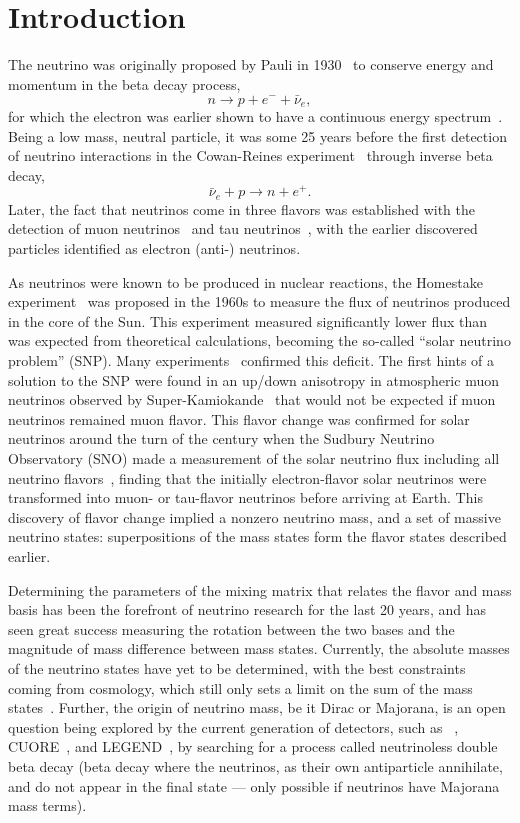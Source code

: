 \chapter{Introduction}
The neutrino was originally proposed by Pauli in 1930~\cite{pauli} to conserve energy and momentum in the beta decay process,
\begin{equation}
n \rightarrow p + e^- + \bar{\nu}_e,
\end{equation}
for which the electron was earlier shown to have a continuous energy spectrum~\cite{chadwick}.
Being a low mass, neutral particle, it was some 25 years before the first detection of neutrino interactions in the Cowan-Reines experiment~\cite{cowan-reines} through inverse beta decay,
\begin{equation}
\bar{\nu}_e + p \rightarrow n + e^+.
\end{equation}
Later, the fact that neutrinos come in three flavors was established with the detection of muon neutrinos~\cite{danby} and tau neutrinos~\cite{donut}, with the earlier discovered particles identified as electron (anti-) neutrinos.

As neutrinos were known to be produced in nuclear reactions, the Homestake experiment~\cite{homestake} was proposed in the 1960s to measure the flux of neutrinos produced in the core of the Sun.
This experiment measured significantly lower flux than was expected from theoretical calculations, becoming the so-called ``solar neutrino problem'' (SNP).
Many experiments~\cite{sage,gallex,gno} confirmed this deficit.
The first hints of a solution to the SNP were found in an up/down anisotropy in atmospheric muon neutrinos observed by Super-Kamiokande~\cite{superk_atmos} that would not be expected if muon neutrinos remained muon flavor. 
This flavor change was confirmed for solar neutrinos around the turn of the century when the Sudbury Neutrino Observatory (SNO) made a measurement of the solar neutrino flux including all neutrino flavors~\cite{sno_direct}, finding that the initially electron-flavor solar neutrinos were transformed into muon- or tau-flavor neutrinos before arriving at Earth.
This discovery of flavor change implied a nonzero neutrino mass, and a set of massive neutrino states: superpositions of the mass states form the flavor states described earlier.

Determining the parameters of the mixing matrix that relates the flavor and mass basis has been the forefront of neutrino research for the last 20 years, and has seen great success measuring the rotation between the two bases and the magnitude of mass difference between mass states. 
Currently, the absolute masses of the neutrino states have yet to be determined, with the best constraints coming from cosmology, which still only sets a limit on the sum of the mass states~\cite{pdg}.
Further, the origin of neutrino mass, be it Dirac or Majorana, is an open question being explored by the current generation of detectors, such as {\snop}~\cite{snop}, CUORE~\cite{cuore}, and LEGEND~\cite{legend}, by searching for a process called neutrinoless double beta decay (beta decay where the neutrinos, as their own antiparticle annihilate, and do not appear in the final state --- only possible if neutrinos have Majorana mass terms).

